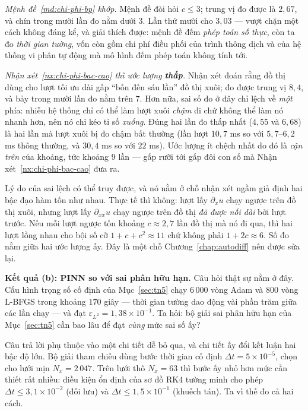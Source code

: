 \emph{Mệnh đề~\ref{md:chi-phi-bp} khớp.} Mệnh đề đòi hỏi $c \le 3$; trung vị đo
được là $2{,}67$, và chín trong mười lần đo nằm dưới $3$. Lần thứ mười cho
$3{,}03$ --- vượt chặn một cách không đáng kể, và giải thích được: mệnh đề đếm
\emph{phép toán số thực}, còn ta đo \emph{thời gian tường}, vốn còn gồm chi phí
điều phối của trình thông dịch và của hệ thống vi phân tự động mà mô hình đếm
phép toán không tính tới.

\emph{Nhận xét~\ref{nx:chi-phi-bac-cao} thì ước lượng \textbf{thấp}.} Nhận xét
đoán rằng đồ thị dùng cho lượt tối ưu dài gấp ``bốn đến sáu lần'' đồ thị xuôi;
đo được trung vị $8{,}4$, và bảy trong mười lần đo nằm trên $7$. Hơn nữa, sai số
đo ở đây chỉ lệch về \emph{một} phía: nhiễu hệ thống chỉ có thể làm lượt xuôi
\emph{chậm} đi chứ không thể làm nó nhanh hơn, nên nó chỉ kéo tỉ số \emph{xuống}.
Đúng hai lần đo thấp nhất ($4{,}55$ và $6{,}68$) là hai lần mà lượt xuôi bị đo
chậm bất thường (lần lượt $10{,}7$ ms so với $5{,}7$--$6{,}2$ ms thông thường, và
$30{,}4$ ms so với $22$ ms). Ước lượng ít chệch nhất do đó là \emph{cận trên} của
khoảng, tức khoảng $9$ lần --- gấp rưỡi tới gấp đôi con số mà
Nhận xét~\ref{nx:chi-phi-bac-cao} đưa ra.

Lý do của sai lệch có thể truy được, và nó nằm ở chỗ nhận xét ngầm giả định hai
bậc đạo hàm tốn như nhau. Thực tế thì không: lượt lấy $\partial_x u$ chạy ngược
trên đồ thị xuôi, nhưng lượt lấy $\partial_{xx} u$ chạy ngược trên đồ thị
\emph{đã được nối dài} bởi lượt trước. Nếu mỗi lượt ngược tốn khoảng $c \approx
2{,}7$ lần đồ thị mà nó đi qua, thì hai lượt lồng nhau cho bội số cỡ
$1 + c + c^2 \approx 11$ chứ không phải $1 + 2c \approx 6$. Số đo nằm giữa hai
ước lượng ấy. Đây là một chỗ Chương~\ref{chap:autodiff} nên được sửa lại.

\textbf{Kết quả (b): PINN so với sai phân hữu hạn.} Câu hỏi thật sự nằm ở đây.
Cấu hình trọng số cố định của Mục~\ref{sec:tn5} chạy $6\,000$ vòng Adam và $800$
vòng L-BFGS trong khoảng $170$ giây --- thời gian tường dao động vài phần trăm
giữa các lần chạy --- và đạt $\varepsilon_{L^2} = 1{,}38\times10^{-1}$. Ta hỏi:
bộ giải sai phân hữu hạn của Mục~\ref{sec:tn5} cần bao lâu để đạt \emph{cùng}
mức sai số ấy?

Câu trả lời phụ thuộc vào một chi tiết dễ bỏ qua, và chi tiết ấy đổi kết luận
hai bậc độ lớn. Bộ giải tham chiếu dùng bước thời gian cố định
$\Delta t = 5\times10^{-5}$, chọn cho lưới mịn $N_x = 2\,047$. Trên lưới thô
$N_x = 63$ thì bước ấy nhỏ hơn mức cần thiết rất nhiều: điều kiện ổn định của
sơ đồ RK4 tường minh cho phép $\Delta t \le 3{,}1\times10^{-2}$ (đối lưu) và
$\Delta t \le 1{,}5\times10^{-1}$ (khuếch tán). Ta vì thế đo cả hai cách.

